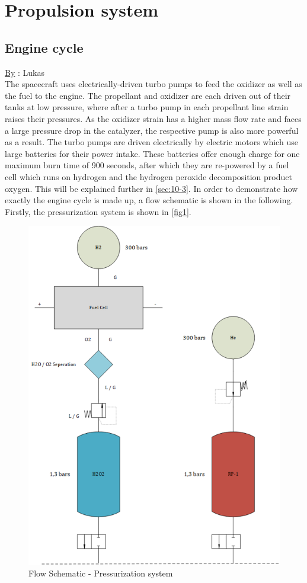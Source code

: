 \chapter{Propulsion system}
\label{chap:10}
\section{Engine cycle}
\qquad \underline{By} : Lukas\\

The spacecraft uses electrically-driven turbo pumps to feed the oxidizer as well as the fuel to the engine. The propellant and oxidizer are each driven out of their tanks at low pressure, where after a turbo pump in each propellant line strain raises their pressures. As the oxidizer strain has a higher mass flow rate and faces a large pressure drop in the catalyzer, the respective pump is also more powerful as a result. The turbo pumps are driven electrically by electric motors which use large batteries for their power intake. These batteries offer enough charge for one maximum burn time of 900 seconds, after which they are re-powered by a fuel cell which runs on hydrogen and the hydrogen peroxide decomposition product oxygen. This will be explained further in \autoref{sec:10-3}. In order to demonstrate how exactly the engine cycle is made up, a flow schematic is shown in the following. Firstly, the pressurization system is shown in \autoref{fig1}.
\begin{figure}[H]
	\centering\includegraphics[width=0.5\linewidth]{pressurizationsystem}
	\caption{Flow Schematic - Pressurization system}\label{fig1}
\end{figure}

